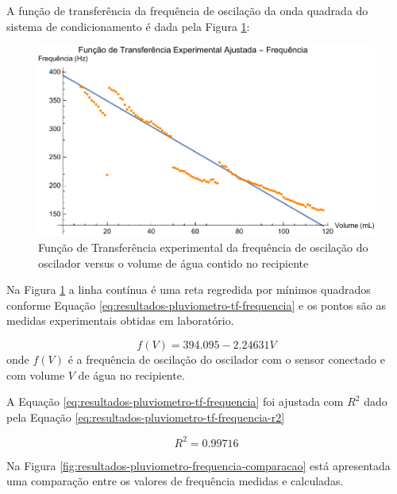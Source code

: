 \documentclass[a4paper]{instrumentacao}
\begin{document}
A função de transferência da frequência de oscilação da onda quadrada do sistema de condicionamento é dada pela Figura \ref{fig:resultados-pluviometro-tf-frequencia}:

\begin{figure}[H]
	\centering \includegraphics[width=\textwidth]{Nivel/Experimental/Frequencia-Ajuste.pdf}
	\caption{Função de Transferência experimental da frequência de oscilação do oscilador versus o volume de água contido no recipiente}
	\label{fig:resultados-pluviometro-tf-frequencia}
\end{figure}


Na Figura \ref{fig:resultados-pluviometro-tf-frequencia} a linha contínua é uma reta regredida por mínimos quadrados conforme Equação \ref{eq:resultados-pluviometro-tf-frequencia} e os pontos são as medidas experimentais obtidas em laboratório.

\begin{equation}
	f(V) = 394.095 - 2.24631 V
	\label{eq:resultados-pluviometro-tf-frequencia}
\end{equation}
\noindent onde $f(V)$ é a frequência de oscilação do oscilador com o sensor conectado e com volume $V$ de água no recipiente.

A Equação \ref{eq:resultados-pluviometro-tf-frequencia} foi ajustada com $R^2$ dado pela Equação \ref{eq:resultados-pluviometro-tf-frequencia-r2} 

\begin{equation}
	R^2 = 0.99716
	\label{eq:resultados-pluviometro-tf-frequencia-r2}
\end{equation}


Na Figura \ref{fig:resultados-pluviometro-frequencia-comparacao} está apresentada uma comparação entre os valores de frequência medidas e calculadas.
\end{document}
